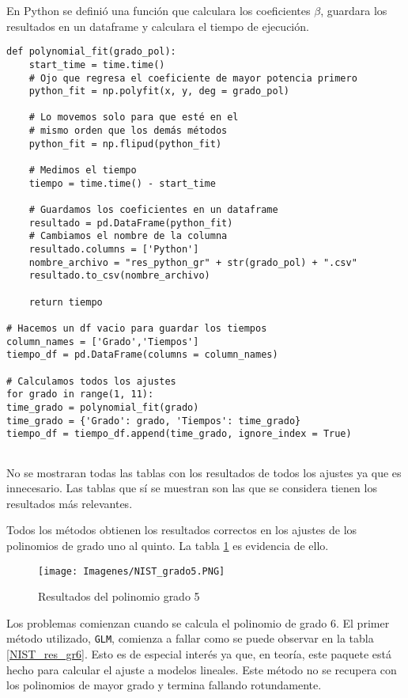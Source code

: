 En \textsf{Python} se definió una función que calculara los coeficientes $\beta$, guardara los resultados en un dataframe y calculara el tiempo de ejecución. 

\begin{verbatim}
def polynomial_fit(grado_pol):
	start_time = time.time()
	# Ojo que regresa el coeficiente de mayor potencia primero
	python_fit = np.polyfit(x, y, deg = grado_pol)
	
	# Lo movemos solo para que esté en el 
	# mismo orden que los demás métodos
	python_fit = np.flipud(python_fit)
	
	# Medimos el tiempo
	tiempo = time.time() - start_time
	
	# Guardamos los coeficientes en un dataframe
	resultado = pd.DataFrame(python_fit)
	# Cambiamos el nombre de la columna
	resultado.columns = ['Python']
	nombre_archivo = "res_python_gr" + str(grado_pol) + ".csv"
	resultado.to_csv(nombre_archivo)
	
	return tiempo
	
# Hacemos un df vacio para guardar los tiempos
column_names = ['Grado','Tiempos']
tiempo_df = pd.DataFrame(columns = column_names)

# Calculamos todos los ajustes
for grado in range(1, 11):
time_grado = polynomial_fit(grado)
time_grado = {'Grado': grado, 'Tiempos': time_grado}
tiempo_df = tiempo_df.append(time_grado, ignore_index = True)
	
\end{verbatim}

No se mostraran todas las tablas con los resultados de todos los ajustes ya que es innecesario. Las tablas que sí se muestran son las que se considera tienen los resultados más relevantes. 

Todos los métodos obtienen los resultados correctos en los ajustes de los polinomios de grado uno al quinto. La tabla \ref{NIST_res_gr5} es evidencia de ello. 

\begin{figure}[h]
\begin{center}
\texttt{[image: Imagenes/NIST\_grado5.PNG]}
\caption{Resultados del polinomio grado 5}
\label{NIST_res_gr5}
\end{center}
\end{figure}

Los problemas comienzan cuando se calcula el polinomio de grado 6. El primer método utilizado, \texttt{GLM}, comienza a fallar como se puede observar en la tabla \ref{NIST_res_gr6}. Esto es de especial interés ya que, en teoría, este paquete está hecho para calcular el ajuste a modelos lineales. Este método no se recupera con los polinomios de mayor grado y termina fallando rotundamente. 

